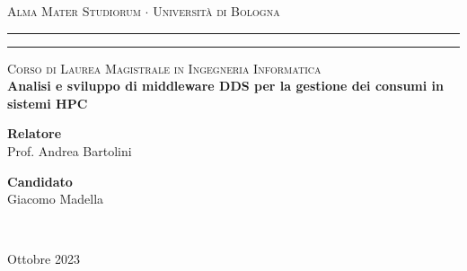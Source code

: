 
\begin{titlepage}
	\begin{center}
		{{\Large{\textsc{Alma Mater Studiorum $\cdot$ Universit\`a di
		Bologna}}}} \rule[0.1cm]{14cm}{0.1mm}
		\rule[0.5cm]{14cm}{0.6mm}
			\large{\textsc{Corso di Laurea Magistrale in Ingegneria Informatica}}
			\\[1.8cm]
			\LARGE
			{\bfseries Analisi e sviluppo di middleware DDS per la gestione dei consumi in sistemi HPC}\\[1.2cm]
	\end{center}
	\vspace{4.5cm}
	\vfill
	\begin{minipage}{0.35\textwidth}
		{\bfseries Relatore}\\
		Prof. Andrea Bartolini 
	\end{minipage}
	\hfill
	\begin{minipage}{0.35\textwidth}
		\begin{flushright} {\bfseries Candidato}\\
		Giacomo Madella \end{flushright} 
	\end{minipage} \\
\begin{center}
	Ottobre 2023
\end{center}

\end{titlepage}




